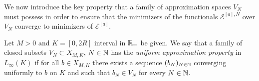 




We now introduce the key property that a family of approximation spaces $V_N$ must possess in order to ensure that the minimizers of the functionals  $\mathcal E^{[a],N}$ over $V_N$ converge to minimizers of $\mathcal E^{[a]}$.

\begin{definition}\label{VNdef}
Let $M > 0$ and $K=[0,2R]$ interval in $\mathbb{R}_+$  be given. We say that a family of closed subsets $V_N \subset X_{M,K}$, $N \in \mathbb{N}$ has the \emph{uniform approximation property} in $L_{\infty}(K)$ if for all $b\in X_{M,K}$ there exists a sequence $(b_N)_{N \in \mathbb{N}}$ converging uniformly to $b$ on $K$ and such that $b_N\in V_N$ for every $N \in \mathbb{N}$.
\end{definition}

